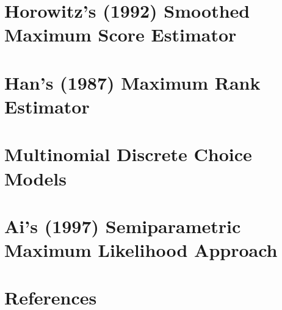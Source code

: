 \documentclass[xcolor=svgnames,dvipdfmx,cjk]{beamer}
\theoremstyle{example}
\begin{document}
\section{Horowitz's (1992) Smoothed Maximum Score Estimator}
\begin{frame}
  \tableofcontents[currentsection]
\end{frame}









\section{Han's (1987) Maximum Rank Estimator}
\begin{frame}
  \tableofcontents[currentsection]
\end{frame}









\section{Multinomial Discrete Choice Models}\begin{frame}
  \tableofcontents[currentsection]
\end{frame}









\section{Ai's (1997) Semiparametric Maximum Likelihood Approach}
\begin{frame}
  \tableofcontents[currentsection]
\end{frame}










\section{References}
\begin{frame}
  \tableofcontents[currentsection]
\end{frame}
\end{document}
